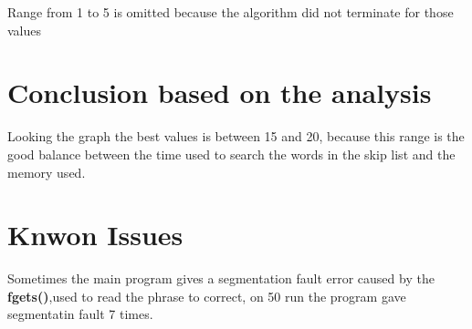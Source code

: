 \newline
Range from 1 to 5 is omitted because the algorithm did not terminate for those values

\section{Conclusion based on the analysis}
Looking the graph the best values is between 15 and 20, because this range is the good balance between the time used to search the words in the skip list and the memory used. 

\section{Knwon Issues}
Sometimes the main program gives a segmentation fault error caused by the \textbf{fgets()},used to read the phrase to correct, on 50 run the program gave segmentatin fault 7 times.